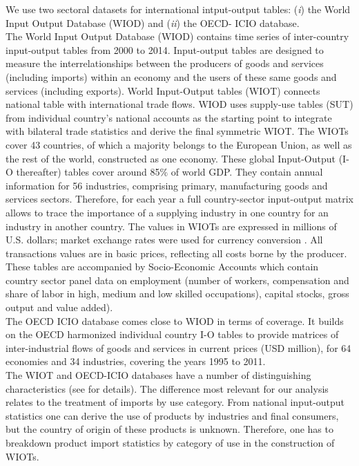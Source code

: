 \documentclass[11pt,a4paper]{article}
\begin{document}
We use two sectoral datasets for international intput-output tables: (\textit{i}) the World Input Output Database (WIOD) and (\textit{ii}) the OECD- ICIO database.\\
The World Input Output Database (WIOD) contains time series of inter-country input-output tables from 2000 to 2014. Input-output tables are designed to measure the interrelationships between the producers of goods and services (including imports) within an economy and the users of these same goods and services (including exports). World Input-Output tables (WIOT) connects national table with international trade flows. WIOD uses supply-use tables (SUT) from individual country's national accounts as the starting point to integrate with bilateral trade statistics and derive the final symmetric WIOT. The WIOTs cover 43 countries, of which a majority belongs to the European Union, as well as the rest of the world, constructed as one economy. 
These global Input-Output (I-O thereafter) tables cover around 85$\%$ of world GDP. They contain annual information for 56 industries, comprising primary, manufacturing goods and services sectors. Therefore, for each year a full country-sector input-output matrix allows to trace the importance of a supplying industry in one country for an industry in another country. The values in WIOTs are expressed in millions of U.S. dollars; market exchange rates were used for currency conversion \citep{TimmerIllustratedUserGuide2015}. All transactions values are in basic prices, reflecting all costs borne by the producer. These tables are accompanied by Socio-Economic Accounts which contain country sector panel data on employment (number of workers, compensation and share of labor in high, medium and low skilled occupations), capital stocks, gross output and value added).\\
The OECD ICIO database comes close to WIOD in terms of coverage. It builds on the OECD harmonized individual country I-O tables to provide matrices of inter-industrial flows of goods and services in current prices (USD million), for 64 economies and 34 industries, covering the years 1995 to 2011. \\
The WIOT and OECD-ICIO databases have a number of distinguishing characteristics (see \cite{TimmerIllustratedUserGuide2015} for details). The difference most relevant for our analysis relates to the treatment of imports by use category. From national input-output statistics one can derive the use of products by industries and final consumers, but the country of origin of these products is unknown. Therefore, one has to breakdown product import statistics by category of use in the construction of WIOTs.\\
\end{document}

